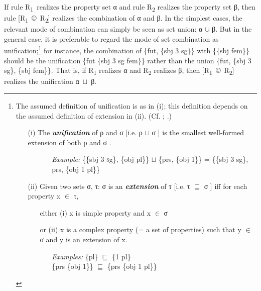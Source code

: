 \documentclass[output=paper,
modfonts
]{LSP/langsci}
\begin{document}
If rule R\textsubscript{1}~realizes the  property set α and rule R\textsubscript{2} realizes the property set β, then rule [R\textsubscript{1}~©~R\textsubscript{2}] realizes the combination of α and β.  In the simplest cases, the relevant mode of combination can simply be seen as set union:  α ${\cup}$ β.  But in the general case, it is preferable to regard the mode of set combination as unification;\footnote{The assumed definition of unification is as in (i); this definition depends on the assumed definition of extension in (ii).  (Cf. \citealt[27]{gpsg}; \citealt[41]{Stump2001}.)
\begin{itemize}
\item[(i)] The \textbf{\textit{unification}} of ρ and σ [i.e. ρ ${\sqcup}$ σ ] is the smallest well\nobreakdash-formed extension of both ρ and σ .
	\begin{itemize}
	\item[]
		\begin{itemize}
		\item[\textit{Example:}] \{\textsc{\{}sbj \textsc{3 s}g\textsc{\}, \{}obj pl\}\} ${\sqcup}$ \{prs, \textsc{\{}obj 1\}\} = \{\{sbj 3 sg\}, prs, \{obj 1 pl\}\} 
		\end{itemize}
	\end{itemize}
\item[(ii)] Given two sets σ, τ:  σ is an \textbf{\textit{extension}} of τ [i.e. τ ${\sqsubseteq}$ σ ] iff for each property x ${\in}$ τ, 
	\begin{itemize}
	\item[either (i)]   x is simple property and x ${\in}$ σ 
	\item[or (ii)] x is a complex property (= a set of properties) such that y ${\in}$ σ and y is an extension of x. 
		\begin{itemize}
		\item[\textit{Examples:}] \{pl\} ${\sqsubseteq}$ \{1 pl\} \\ \{prs \{obj 1\}\} ${\sqsubseteq}$ \{prs \{obj 1 pl\}\}
		\end{itemize}
	\end{itemize}
\end{itemize}}
for instance, the combination of \{fut, \{sbj 3 sg\}\} with \{\{sbj fem\}\} should be the unification \{fut \{sbj 3 sg fem\}\} rather than the union \{fut, \{sbj 3 sg\}, \{sbj fem\}\}.  That is, if R\textsubscript{1} realizes α and R\textsubscript{2} realizes β, then [R\textsubscript{1}~©~R\textsubscript{2}] realizes the unification α~${\sqcup}$~β.
\end{document}
